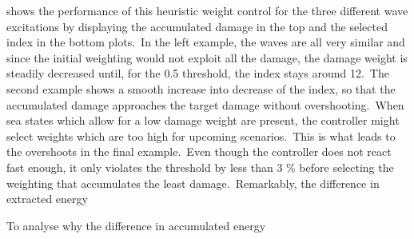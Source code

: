  shows the performance of this heuristic weight control for the three different wave excitations by displaying the accumulated damage in the top and the selected index in the bottom plots.\ 
In the left example, the waves are all very similar and since the initial weighting would not exploit all the damage, the damage weight is steadily decreased until, for the 0.5 threshold, the index stays around 12.\
The second example shows a smooth increase into decrease of the index, so that the accumulated damage approaches the target damage without overshooting.\ 
When sea states which allow for a low damage weight are present, the controller might select weights which are too high for upcoming scenarios.\ 
This is what leads to the overshoots in the final example.\ 
Even though the controller does not react fast enough, it only violates the threshold by less than 3 \% before selecting the weighting that accumulates the least damage.\ 
Remarkably, the difference in extracted energy

To analyse why the difference in accumulated energy


